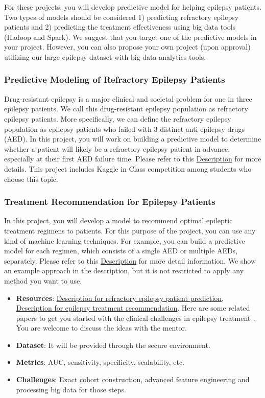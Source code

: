 \documentclass[journal]{IEEEtran}
\begin{document}
For these projects, you will develop predictive model for helping epilepsy patients. Two types of models should be considered 1) predicting refractory epilepsy patients and 2) predicting the treatment effectiveness using big data tools (Hadoop and Spark).
We suggest that you target one of the predictive models in your project. However, you can also propose your own project (upon approval) utilizing our large epilepsy dataset with big data analytics tools. 

\subsubsection{Predictive Modeling of Refractory Epilepsy Patients}
Drug-resistant epilepsy is a major clinical and societal problem for one in three epilepsy patients. We call this drug-resistant epilepsy population as refractory epilepsy patients. More specifically, we can define the refractory epilepsy population as epilepsy patients who failed with 3 distinct anti-epilepsy drugs (AED). In this project, you will work on building a predictive model to determine whether a patient will likely be a refractory epilepsy patient in advance, especially at their first AED failure time. Please refer to this \href{https://www.overleaf.com/read/qbxymxrpzqhg}{Description} for more details. This project includes Kaggle in Class competition among students who choose this topic.

\subsubsection{Treatment Recommendation for Epilepsy Patients}
In this project, you will develop a model to recommend optimal epileptic treatment regimens to patients. For this purpose of the project, you can use any kind of machine learning techniques. For example, you can build a predictive model for each regimen, which consists of a single AED or multiple AEDs, separately. Please refer to this \href{https://www.overleaf.com/read/ncmybvjkjcfs}{Description} for more detail information. We show an example approach in the description, but it is not restricted to apply any method you want to use.

\begin{itemize}
	\item \textbf{Resources}:  \href{https://www.overleaf.com/read/qbxymxrpzqhg}{Description for refractory epilepsy patient prediction}, \href{https://www.overleaf.com/read/ncmybvjkjcfs}{Description for epilepsy treatment recommendation}. Here are some related papers to get you started with the clinical challenges in epilepsy treatment~\cite{kwan_early_2000,schmidt_drug_2005,gilioli_focal_2012,voll_predicting_2015}. You are welcome to discuss the ideas with the mentor. 
   	\item \textbf{Dataset}: It will be provided through the secure environment.
    \item \textbf{Metrics}: AUC, sensitivity, specificity, scalability, etc.
    \item \textbf{Challenges}: Exact cohort construction, advanced feature engineering and processing big data for those steps.
\end{itemize}
\end{document}

